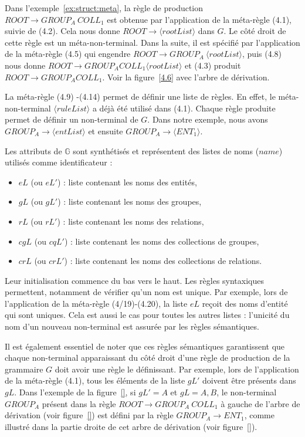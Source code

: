 Dans l'exemple~\ref{ex:struct:meta}, la règle de production $ROOT \rightarrow GROUP_A ~ COLL_1$ est obtenue par l'application de la méta-règle (4.1), suivie de (4.2).
Cela nous donne $ROOT \rightarrow \langle rootList \rangle$ dans $G$.
Le côté droit de cette règle est un méta-non-terminal.
Dans la suite, il est spécifié par l'application de la méta-règle (4.5) qui engendre $ROOT \rightarrow GROUP_A ~ \langle rootList \rangle$, puis (4.8) nous donne $ROOT \rightarrow GROUP_A COLL_1 \langle rootList \rangle$ et (4.3) produit $ROOT \rightarrow GROUP_A COLL_1  $.
Voir la figure~\ref{4.6} avec l'arbre de dérivation.

La méta-règle  (4.9) -(4.14) permet de définir une liste de règles. En effet, le méta-non-terminal $\langle ruleList \rangle$ a déjà été utilisé dans (4.1).
Chaque règle produite permet de définir un non-terminal de $G$.
Dans notre exemple, nous avons $GROUP_A \rightarrow  \langle entList \rangle$ et ensuite $GROUP_A \rightarrow  \langle ENT_1 \rangle$.

Les attributs de $\mathbb{G}$ sont synthétisés et représentent des listes de noms ($name$) utilisés comme identificateur :
\begin{itemize}
    \item $eL$ (ou $eL'$) : liste contenant les noms des entités,
    \item $gL$ (ou $gL'$) : liste contenant les noms des groupes,
    \item $rL$ (ou $rL'$) : liste contenant les noms des relations,
    \item $cgL$ (ou $cqL'$) : liste contenant les noms des collections de groupes,
    \item $crL$ (ou $crL'$) : liste contenant les noms des collections de relations.
\end{itemize}

Leur initialisation commence du bas vers le haut.
Les règles syntaxiques permettent, notamment de vérifier qu'un nom est unique.
Par exemple, lors de l'application de la méta-règle (4/19)-(4.20), la liste $eL$ reçoit des noms d'entité qui sont uniques.
Cela est aussi le cas pour toutes les autres listes : l'unicité du nom d'un nouveau non-terminal est assurée par les règles sémantiques.

Il est également essentiel de noter que ces règles sémantiques garantissent que chaque non-terminal apparaissant du côté droit d'une règle de production de la grammaire $G$ doit avoir une règle le définissant.
Par exemple, lors de l'application de la méta-règle (4.1), tous les éléments de la liste $gL'$ doivent être présents dans $gL$.
Dans l'exemple de la figure~\ref{}, si $gL' = {A}$ et $gL = {A, B}$, le non-terminal $GROUP_A$ présent dans la règle $ROOT \rightarrow GROUP_A ~ COLL_1$ à gauche de l'arbre de dérivation (voir figure~\ref{}) est défini par la règle $GROUP_A \rightarrow ENT_1$, comme illustré dans la partie droite de cet arbre de dérivation (voir figure~\ref{}).

